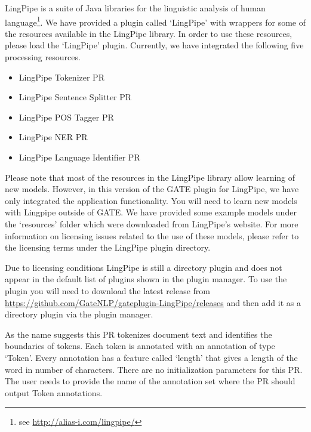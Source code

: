 LingPipe is a suite of Java libraries for the linguistic analysis of human
language\footnote{see \url{http://alias-i.com/lingpipe/}}.  We have provided a plugin 
called `LingPipe' with wrappers for some of the resources available in the 
LingPipe library. In order to use these resources, please load the `LingPipe' 
plugin. Currently, we have integrated the following five processing resources. 

\begin{itemize}
\item{LingPipe Tokenizer PR}
\item{LingPipe Sentence Splitter PR}
\item{LingPipe POS Tagger PR}
\item{LingPipe NER PR}
\item{LingPipe Language Identifier PR}
\end{itemize}

Please note that most of the resources in the LingPipe library allow learning
of new models.  However, in this version of the GATE plugin for LingPipe, we
have only integrated the application functionality. You will need to learn new
models with Lingpipe outside of GATE. We have provided some example models
under the `resources' folder which were downloaded from LingPipe's
website. For more information on licensing issues related to the use of these
models, please refer to the licensing terms under the LingPipe plugin
directory.

Due to licensing conditions LingPipe is still a directory plugin and does
not appear in the default list of plugins shown in the plugin manager. To
use the plugin you will need to download the latest release from
\url{https://github.com/GateNLP/gateplugin-LingPipe/releases}
and then add it as a directory plugin via the plugin manager.


As the name suggests this PR tokenizes document text and identifies the
boundaries of tokens.  Each token is annotated with an annotation of type
`Token'. Every annotation has a feature called `length' that gives a length of
the word in number of characters.  There are no initialization parameters for
this PR. The user needs to provide the name of the annotation set where the PR
should output Token annotations.

